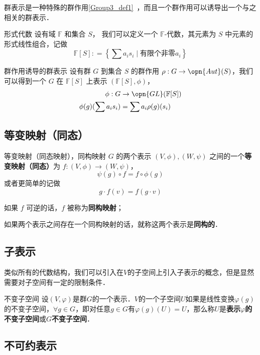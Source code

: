 群表示是一种特殊的群作用\autoref{Group3_def1}~，而且一个群作用可以诱导出一个与之相关的群表示．

\begin{definition}{形式代数}
设有域 $\mathbb{F}$ 和集合 $S$， 我们可以定义一个 $\mathbb{F}$-代数，其元素为 $S$ 中元素的形式线性组合，记做
$$
\mathbb{F}[S]: = \left\{ \sum a_i s_i \mid \text{有限个非零} a_i \right\}
$$
\end{definition}

\begin{definition}{群作用诱导的群表示}
设有群 $G$ 到集合 $S$ 的群作用 $\rho: G \to \opn{Aut}(S)$，我们可以得到一个 $G$ 在 $\mathbb{F}[S]$ 上表示 $(\mathbb{F}[S], \phi)$，
$$\begin{aligned}
\phi: G &\to \opn{GL}(\mathbb{F}[S]) \\
\phi(g)(\sum a_i s_i) &= \sum a_i \rho(g)(s_i)
\end{aligned}$$
\end{definition}

\subsection{等变映射（同态）}

\begin{definition}{等变映射（同态映射），同构映射}
$G$ 的两个表示 $(V, \phi), (W, \psi)$ 之间的一个\textbf{等变映射（同态）}为 $f: (V, \phi) \to (W, \psi)$，
$$
\psi(g) \circ f = f \circ \phi(g)
$$
或者更简单的记做
$$
g \cdot f(v) = f(g \cdot v)
$$

如果 $f$ 可逆的话，$f$ 被称为\textbf{同构映射}；

如果两个表示之间存在一个同构映射的话，就称这两个表示是\textbf{同构的}．
\end{definition}


\subsection{子表示}

类似所有的代数结构，我们可以引入在$V$的子空间上引入子表示的概念，但是显然需要对子空间有一定的限制条件．

\begin{definition}{不变子空间}
设$(V,\varphi)$是群$G$的一个表示．$V$的一个子空间$U$如果是线性变换$\varphi(g)$的不变子空间，$\forall g\in G$，即对任意$g\in G$有$\varphi(g)(U)=U$，那么称$U$是\textbf{表示$\varphi$的不变子空间}或\textbf{$G$不变子空间}．
\end{definition}

\subsection{不可约表示}
